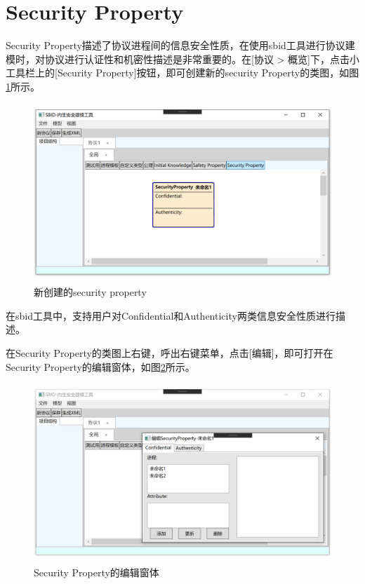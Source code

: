 \section{Security Property}
Security Property描述了协议进程间的信息安全性质，在使用sbid工具进行协议建模时，对协议进行认证性和机密性描述是非常重要的。在[协议 > 概览]下，点击小工具栏上的[Security Property]按钮，即可创建新的security Property的类图，如图\ref{create_security}所示。
\begin{figure}[h]
	\centering
	\includegraphics[width=12cm,height=6.75cm]{imgs/create_security.png}
	\caption{新创建的security property}
	\label{create_security}
\end{figure}
\par
在sbid工具中，支持用户对Confidential和Authenticity两类信息安全性质进行描述。
\par
在Security Property的类图上右键，呼出右键菜单，点击[编辑]，即可打开在Security Property的编辑窗体，如图\ref{security_edit_window}所示。
\begin{figure}[h]
	\centering
	\includegraphics[width=12cm,height=6.75cm]{imgs/security_edit_window.png}
	\caption{Security Property的编辑窗体}
	\label{security_edit_window}
\end{figure}
\par
